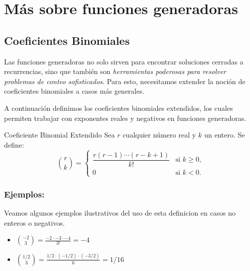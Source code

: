

\section{Más sobre funciones generadoras}

\subsection{Coeficientes Binomiales}
Las funciones generadoras no solo sirven para encontrar soluciones cerradas a recurrencias, sino que también son \emph{herramientas poderosas para resolver problemas de conteo sofisticados}. Para esto, necesitamos extender la noción de coeficientes binomiales a casos más generales.

A continuación definimos los coeficientes binomiales extendidos, los cuales permiten trabajar con exponentes reales y negativos en funciones generadoras.

\begin{definitionblock}{Coeficiente Binomial Extendido}
Sea $r$ cualquier número real y $k$ un entero. Se define:
$$
  \binom{r}{k} =
  \begin{cases}
    \dfrac{r(r-1)\cdots (r-k+1)}{k!} & \text{si } k \geq 0, \\
    0 & \text{si } k < 0.
  \end{cases}
$$
\end{definitionblock}

\subsubsection*{Ejemplos:}
Veamos algunos ejemplos ilustrativos del uso de esta definicion en casos no enteros o negativos.
\begin{itemize}
\item $\displaystyle \binom{-2}{3} = \frac{-2 \cdot -3 \cdot -4}{3!} = -4$
\item $\displaystyle \binom{1/2}{3} = \frac{1/2 \cdot (-1/2) \cdot (-3/2)}{6} = 1/16$
\end{itemize}

